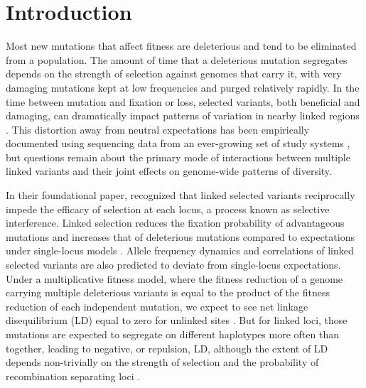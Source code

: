 \documentclass[]{article}
\begin{document}
\section{Introduction}\label{sec:introduction}

Most new mutations that affect fitness are deleterious and tend to be
eliminated from a population. The amount of time that a deleterious mutation
segregates depends on the strength of selection against genomes that carry it,
with very damaging mutations kept at low frequencies and purged relatively
rapidly. In the time between mutation and fixation or loss, selected variants,
both beneficial and damaging, can dramatically impact patterns of variation in
nearby linked regions \citep[e.g.,][]{Smith1974-em,Charlesworth1995-dq,Kim2000-on}.
This distortion away from neutral expectations has been empirically documented
using sequencing data from an ever-growing set of study systems
\citep{Novembre2009-kc,Cutter2013-mm,Comeron2014-oy}, but questions
remain about the primary mode of interactions between multiple linked variants
and their joint effects on genome-wide patterns of diversity.

In their foundational paper, \citet{Hill1966-gv} recognized that linked
selected variants reciprocally impede the efficacy of selection at each locus,
a process known as selective interference. Linked selection reduces the
fixation probability of advantageous mutations and increases that of
deleterious mutations compared to expectations under single-locus models
\citep{Birky1988-jm}. Allele frequency dynamics and correlations of linked
selected variants are also predicted to deviate from single-locus expectations.
Under a multiplicative fitness model, where the fitness reduction of a genome
carrying multiple deleterious variants is equal to the product of the fitness
reduction of each independent mutation, we expect to see net linkage
disequilibrium (LD) equal to zero for unlinked sites \citep{Kondrashov1995-va}.
But for linked loci, those mutations are expected to segregate on different
haplotypes more often than together, leading to negative, or repulsion, LD,
although the extent of LD depends non-trivially on the strength of selection
and the probability of recombination separating loci
\citep{Hill1966-gv,McVean2000-ox}.
\end{document}
